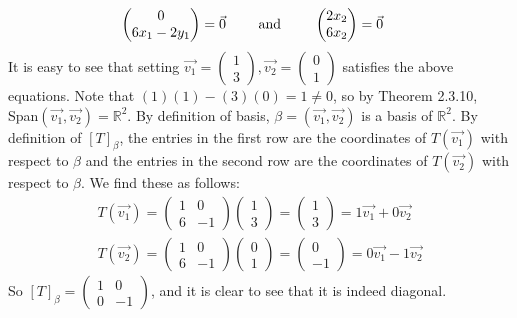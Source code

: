 \documentclass[12pt]{article}
\newenvironment{problem}[2][Problem]
{
	\begin{trivlist} 
		\item[\hskip \labelsep {\bfseries #1 #2:}]
	}
{
	\end{trivlist}
	}
\newenvironment{solution}[1][Solution]
{
	\begin{trivlist} 
		\item[\hskip \labelsep {\itshape #1:}]
	}
	{
	\end{trivlist}
}
\begin{document}
\begin{problem}{5}
\begin{solution}
\begin{align}
\begin{pmatrix} 0\\6x_{1}-2y_{1} \end{pmatrix}=\vec{0} \hphantom{1000} \text{ and }& \hphantom{1000} \begin{pmatrix} 2x_{2}\\6x_{2}\end{pmatrix}=\vec{0}
\end{align}
It is easy to see that setting $\vec{v_{1}}=\begin{pmatrix}1\\3\end{pmatrix},\vec{v_{2}}=\begin{pmatrix}0\\1\end{pmatrix}$ satisfies the above equations. Note that $(1)(1)-(3)(0)=1\neq 0$, so by Theorem 2.3.10, Span$(\vec{v_{1}},\vec{v_{2}})=\mathbb{R}^2$. By definition of basis, $\beta=(\vec{v_{1}},\vec{v_{2}})$ is a basis of $\mathbb{R}^2$. By definition of $[T]_{\beta}$, the entries in the first row are the coordinates of $T(\vec{v_{1}})$ with respect to $\beta$ and the entries in the second row are the coordinates of $T(\vec{v_{2}})$ with respect to $\beta$. We find these as follows:
\begin{align*}
T(\vec{v_{1}})=\begin{pmatrix} 1&0\\6&-1\end{pmatrix}\begin{pmatrix}1\\3\end{pmatrix} = \begin{pmatrix}1\\3\end{pmatrix} = 1\vec{v_{1}} + 0\vec{v_{2}}\\
T(\vec{v_{2}})=\begin{pmatrix} 1&0\\6&-1\end{pmatrix}\begin{pmatrix}0\\1\end{pmatrix} = \begin{pmatrix}0\\-1\end{pmatrix} = 0\vec{v_{1}} - 1\vec{v_{2}}
\end{align*}
So $[T]_{\beta}=\begin{pmatrix}1&0\\0&-1\end{pmatrix}$, and it is clear to see that it is indeed diagonal.
\end{solution}
\end{problem}
\end{document}
